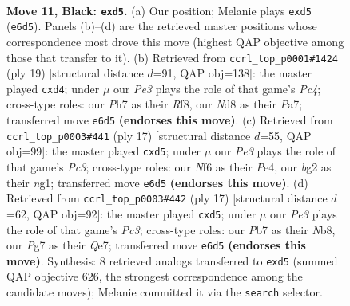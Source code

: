 \documentclass[11pt]{article}
\begin{document}
\clearpage

\begin{figure}[p]\centering
\begin{subfigure}{0.46\textwidth}\centering
\resizebox{\linewidth}{!}{%
\newchessgame
\chessboard[
  setfen={r1bn1r1k/1pppqppp/p3pn2/3P4/2P5/2B1PNP1/PP3PBP/R2Q1RK1 b - - 2 11},
  showmover=false,
  pgfstyle=straightmove, color=movearrow, markmove={e6-d5}
]}
\caption{}
\end{subfigure}\hfill
\begin{subfigure}{0.46\textwidth}\centering
\resizebox{\linewidth}{!}{%
\newchessgame
\chessboard[
  setfen={r1b2rk1/pp1pqppp/2n2n2/2p1p3/2PP4/1P2PN2/PB2BPPP/R2QK2R b KQ - 0 10},
  showmover=false,
  pgfstyle=straightmove, color=movearrow, markmove={c5-d4}
]}
\caption{}
\end{subfigure}
\\[4pt]
\begin{subfigure}{0.46\textwidth}\centering
\resizebox{\linewidth}{!}{%
\newchessgame
\chessboard[
  setfen={rnb2rk1/pp1pqppp/2p2n2/3P4/2P1p3/P1B3P1/1P2PPBP/R2QK1NR b KQ - 0 9},
  showmover=false,
  pgfstyle=straightmove, color=movearrow, markmove={c6-d5}
]}
\caption{}
\end{subfigure}\hfill
\begin{subfigure}{0.46\textwidth}\centering
\resizebox{\linewidth}{!}{%
\newchessgame
\chessboard[
  setfen={rnb2rk1/pp1pqppp/2p2n2/3P4/2P1p3/P1B3PN/1P2PP1P/R2QKB1R b KQ - 0 9},
  showmover=false,
  pgfstyle=straightmove, color=movearrow, markmove={c6-d5}
]}
\caption{}
\end{subfigure}
\caption{\textbf{Move 11, Black: \texttt{exd5}.} (a) Our position; Melanie plays \texttt{exd5} (\texttt{e6d5}). Panels (b)--(d) are the retrieved master positions whose correspondence most drove this move (highest QAP objective among those that transfer to it). (b) Retrieved from \texttt{ccrl\_top\_p0001\#1424} (ply 19) [structural distance $d$=91, QAP obj=138]: the master played \texttt{cxd4}; under $\mu$ our \emph{Pe3} plays the role of that game's \emph{Pc4}; cross-type roles: our \emph{P}h7 as their \emph{R}f8, our \emph{N}d8 as their \emph{P}a7; transferred move \texttt{e6d5} \textbf{(endorses this move)}. (c) Retrieved from \texttt{ccrl\_top\_p0003\#441} (ply 17) [structural distance $d$=55, QAP obj=99]: the master played \texttt{cxd5}; under $\mu$ our \emph{Pe3} plays the role of that game's \emph{Pc3}; cross-type roles: our \emph{N}f6 as their \emph{P}e4, our \emph{b}g2 as their \emph{n}g1; transferred move \texttt{e6d5} \textbf{(endorses this move)}. (d) Retrieved from \texttt{ccrl\_top\_p0003\#442} (ply 17) [structural distance $d$=62, QAP obj=92]: the master played \texttt{cxd5}; under $\mu$ our \emph{Pe3} plays the role of that game's \emph{Pc3}; cross-type roles: our \emph{P}b7 as their \emph{N}b8, our \emph{P}g7 as their \emph{Q}e7; transferred move \texttt{e6d5} \textbf{(endorses this move)}. Synthesis: 8 retrieved analogs transferred to \texttt{exd5} (summed QAP objective 626, the strongest correspondence among the candidate moves); Melanie committed it via the \texttt{search} selector.}
\label{fig:thought-m21}
\end{figure}
\end{document}
